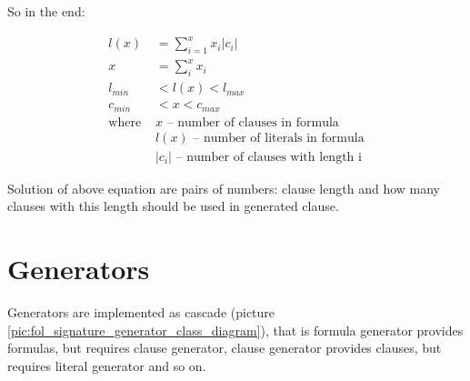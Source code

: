 So in the end:

\begin{align}
	l(x) &= \sum_{i=1}^{x} x_i |c_i| \\
	x &= \sum_i^x x_i \\
	l_{min} &< l(x) < l_{max} \\
	c_{min} &< x < c_{max} \\
	\text{where } 
		&x \text{ -- number of clauses in formula} \nonumber \\
		&l(x) \text{ -- number of literals in formula} \nonumber  \\
		&|c_i| \text{ -- number of clauses with length i} \nonumber
\end{align}

Solution of above equation are pairs of numbers: clause length and how many clauses with this length should be used in generated clause.

\section{Generators}
\label{sec:Generators}

Generators are implemented as cascade (picture \ref{pic:fol_signature_generator_class_diagram}), that is formula generator provides formulas, but requires clause generator, clause generator provides clauses, but requires literal generator and so on.

